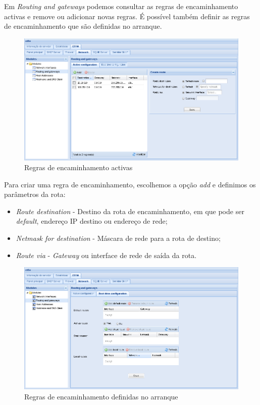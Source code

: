 Em \textit{Routing and gateways} podemos consultar as regras de encaminhamento activas e remove ou adicionar novas regras.
É possível também definir as regras de encaminhamento que são definidas no arranque.

\begin{figure}[H]
    \begin{center}
    \includegraphics[scale=0.38]{screenshots/etfw/etfw_network_routing_01.png}
    \caption{Regras de encaminhamento activas}
    \label{fig:etfw_network_routing_01}
    \end{center}
\end{figure}

Para criar uma regra de encaminhamento, escolhemos a opção \textit{add} e definimos os parâmetros da rota: 

\begin{itemize}
    \item \textit{Route destination} - Destino da rota de encaminhamento, em que pode ser \textit{default}, endereço IP destino ou endereço de rede;
    \item \textit{Netmask for destination} - Máscara de rede para a rota de destino;
    \item \textit{Route via} - \textit{Gateway} ou interface de rede de saída da rota.
\end{itemize}

\begin{figure}[H]
    \begin{center}
    \includegraphics[scale=0.38]{screenshots/etfw/etfw_network_routing_02.png}
    \caption{Regras de encaminhamento definidas no arranque}
    \label{fig:etfw_network_routing_02}
    \end{center}
\end{figure}

